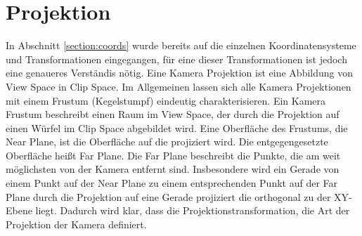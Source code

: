 \section{Projektion}
In Abschnitt \ref{section:coords} wurde bereits auf die einzelnen Koordinatensysteme und Transformationen eingegangen,
für eine dieser Transformationen ist jedoch eine genaueres Verständis nötig.
Eine Kamera Projektion ist eine Abbildung von View Space in Clip Space.
Im Allgemeinen lassen sich alle Kamera Projektionen mit einem Frustum (Kegelstumpf) eindeutig charakterisieren.
Ein Kamera Frustum beschreibt einen Raum im View Space, 
der durch die Projektion auf einen Würfel im Clip Space abgebildet wird.
Eine Oberfläche des Frustums, die Near Plane, ist die Oberfläche auf die projiziert wird.
Die entgegengesetzte Oberfläche heißt Far Plane. 
Die Far Plane beschreibt die Punkte, die am weit möglichsten von der Kamera entfernt sind.
Insbesondere wird ein Gerade von einem Punkt auf der Near Plane zu einem entsprechenden Punkt auf der Far Plane
durch die Projektion auf eine Gerade projiziert die orthogonal zu der XY-Ebene liegt.
Dadurch wird klar, dass die Projektionstransformation, die Art der Projektion der Kamera definiert.




